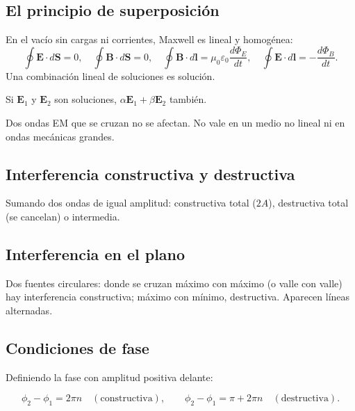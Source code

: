 \documentclass[12pt,a4paper]{article}
\begin{document}
\subsection{El principio de superposición}

En el vacío sin cargas ni corrientes, Maxwell es lineal y homogénea:
\[
\oint \mathbf{E}\cdot d\mathbf{S} = 0, \quad
\oint \mathbf{B}\cdot d\mathbf{S} = 0, \quad
\oint \mathbf{B}\cdot d\mathbf{l} = \mu_0\varepsilon_0\frac{d\Phi_E}{dt}, \quad
\oint \mathbf{E}\cdot d\mathbf{l} = -\frac{d\Phi_B}{dt}.
\]
Una combinación lineal de soluciones es solución.

\begin{keybox}
  Si $\mathbf{E}_1$ y $\mathbf{E}_2$ son soluciones, $\alpha\mathbf{E}_1 +
  \beta\mathbf{E}_2$ también.
\end{keybox}

\begin{notebox}[Sorprendente]
  Dos ondas EM que se cruzan no se afectan. No vale en un medio no lineal ni en
  ondas mecánicas grandes.
\end{notebox}



\subsection{Interferencia constructiva y destructiva}

Sumando dos ondas de igual amplitud: constructiva total ($2A$), destructiva
total (se cancelan) o intermedia.

\subsection{Interferencia en el plano}

Dos fuentes circulares: donde se cruzan máximo con máximo (o valle con valle)
hay interferencia constructiva; máximo con mínimo, destructiva. Aparecen líneas
alternadas.

\subsection{Condiciones de fase}

Definiendo la fase con amplitud positiva delante:

\begin{keybox}
  \[
  \boxed{\phi_2 - \phi_1 = 2\pi n} \quad(\text{constructiva}), \qquad
  \boxed{\phi_2 - \phi_1 = \pi + 2\pi n} \quad(\text{destructiva}).
  \]
\end{keybox}
\end{document}
